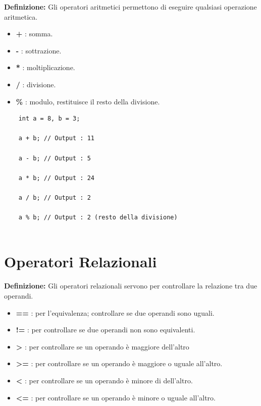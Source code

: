 \textsf{\small \textbf{Definizione: } Gli operatori aritmetici permettono di eseguire qualsiasi operazione aritmetica.} \\

\begin{itemize}
	\item \textsf{\small \textbf{+} : somma.}
	\item \textsf{\small \textbf{-} : sottrazione.}
	\item \textsf{\small \textbf{*} : moltiplicazione.}
	\item \textsf{\small \textbf{/} : divisione.}
	\item \textsf{\small \textbf{\%} : modulo, restituisce il resto della divisione.}
\end{itemize}

\begin{lstlisting}
	int a = 8, b = 3;
	
	a + b; // Output : 11
	
	a - b; // Output : 5
	
	a * b; // Output : 24
	
	a / b; // Output : 2
	
	a % b; // Output : 2 (resto della divisione)
	
\end{lstlisting}


\section{Operatori Relazionali}

\textsf{\small \textbf{Definizione: } Gli operatori relazionali servono per controllare la relazione tra due operandi. } \\

\begin{itemize}
	\item \textsf{\small \textbf{==} : per l'equivalenza; controllare se due operandi sono uguali.}
	\item \textsf{\small \textbf{!=} : per controllare se due operandi non sono equivalenti.}
	\item \textsf{\small \textbf{>} : per controllare se un operando è maggiore dell'altro}
	\item \textsf{\small \textbf{>=} : per controllare se un operando è maggiore o uguale all'altro.}
	\item \textsf{\small \textbf{<} : per controllare se un operando è minore di dell'altro.}
	\item \textsf{\small \textbf{<=} : per controllare se un operando è minore o uguale all'altro.}
\end{itemize}

